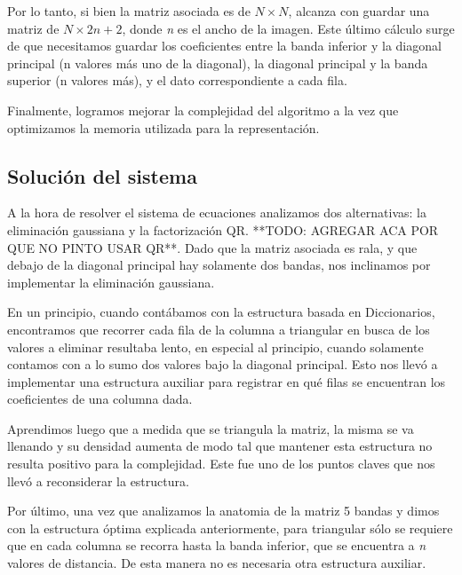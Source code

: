 \documentclass[a4paper]{article}
\begin{document}
Por lo tanto, si bien la matriz asociada es de $N \times N$, alcanza con guardar una matriz de $N \times 2n + 2$, donde \textit{n} es el ancho de la imagen. Este último cálculo surge de que necesitamos guardar los coeficientes entre la banda inferior y la diagonal principal (n valores más uno de la diagonal), la diagonal principal y la banda superior (n valores más), y el dato correspondiente a cada fila.

Finalmente, logramos mejorar la complejidad del algoritmo a la vez que optimizamos la memoria utilizada para la representación.

\subsection{Solución del sistema}

A la hora de resolver el sistema de ecuaciones analizamos dos alternativas: la eliminación gaussiana y la factorización QR. **TODO: AGREGAR ACA POR QUE NO PINTO USAR QR**. Dado que la matriz asociada es rala, y que debajo de la diagonal principal hay solamente dos bandas, nos inclinamos por implementar la eliminación gaussiana.

En un principio, cuando contábamos con la estructura basada en Diccionarios, encontramos que recorrer cada fila de la columna a triangular en busca de los valores a eliminar resultaba lento, en especial al principio, cuando solamente contamos con a lo sumo dos valores bajo la diagonal principal. Esto nos llevó a implementar una estructura auxiliar para registrar en qué filas se encuentran los coeficientes de una columna dada.

Aprendimos luego que a medida que se triangula la matriz, la misma se va llenando y su densidad aumenta de modo tal que mantener esta estructura no resulta positivo para la complejidad. Este fue uno de los puntos claves que nos llevó a reconsiderar la estructura.

Por último, una vez que analizamos la anatomia de la matriz 5 bandas y dimos con la estructura óptima explicada anteriormente, para triangular sólo se requiere que en cada columna se recorra hasta la banda inferior, que se encuentra a \textit{n} valores de distancia. De esta manera no es necesaria otra estructura auxiliar.  


\end{document}
